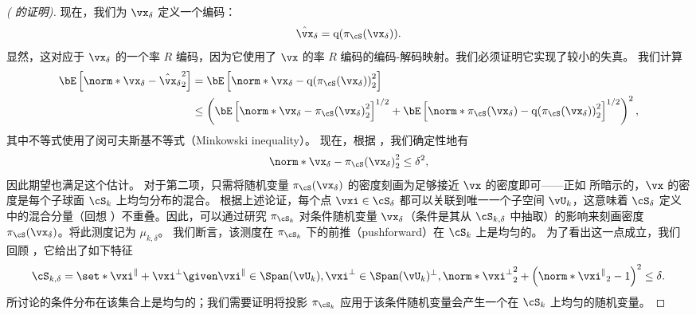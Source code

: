 \documentclass[../../book-main_zh.tex]{subfiles}
\begin{document}
\begin{proof}[( 的证明)]
    现在，我们为 $\vx_{\delta}$ 定义一个编码：
    \begin{equation}
        \hat{\vx}_{\delta} = \mathrm{q}( \pi_{\cS}(\vx_{\delta}) ).
    \end{equation}
    显然，这对应于 $\vx_{\delta}$ 的一个率 $R$ 编码，因为它使用了 $\vx$ 的率 $R$ 编码的编码-解码映射。我们必须证明它实现了较小的失真。
    我们计算
    \begin{align}
        \bE\left[ \norm*{ \vx_{\delta} - \hat{\vx}_{\delta} }_2^2 \right]
        &=
        \bE\left[ \norm*{ \vx_{\delta} -
        \mathrm{q}(\pi_{\cS}(\vx_{\delta})) }_2^2 \right]
        \\
        &\leq
        \left(
            \bE\left[ \norm*{ \vx_{\delta} - \pi_{\cS}(\vx_{\delta}) }_2^2
            \right]^{1/2}
            + \bE\left[ \norm*{ \pi_{\cS}(\vx_{\delta})
            - \mathrm{q}(\pi_{\cS}(\vx_{\delta})) }_2^2 \right]^{1/2}
        \right)^2,\label{eq:distortion-decomposition}
    \end{align}
    其中不等式使用了闵可夫斯基不等式（Minkowski inequality）。
    现在，根据 ，我们确定性地有
    \begin{equation}
        \norm*{ \vx_{\delta} - \pi_{\cS}(\vx_{\delta}) }_2^2
        \leq \delta^2,
    \end{equation}
    因此期望也满足这个估计。
    对于第二项，只需将随机变量 $\pi_{\cS}(\vx_{\delta})$ 的密度刻画为足够接近 $\vx$ 的密度即可——正如  所暗示的，$\vx$ 的密度是每个子球面 $\cS_k$ 上均匀分布的混合。
    根据上述论证，每个点 $\vxi \in \cS_{\delta}$ 都可以关联到唯一一个子空间 $\vU_k$，这意味着 $\cS_{\delta}$ 定义中的混合分量（回想 ）不重叠。因此，可以通过研究 $\pi_{\cS_k}$ 对条件随机变量 $\vx_{\delta}$（条件是其从 $\cS_{k, \delta}$ 中抽取）的影响来刻画密度 $\pi_{\cS}(\vx_{\delta})$。将此测度记为 $\mu_{k, \delta}$。
    我们断言，该测度在 $\pi_{\cS_k}$ 下的前推（pushforward）在 $\cS_k$ 上是均匀的。
    为了看出这一点成立，我们回顾 ，它给出了如下特征
    \begin{equation}
        \cS_{k, \delta} = \set*{
            \vxi^{\|} + \vxi^{\perp}
            \given
            \vxi^{\|} \in \Span(\vU_k),
            \vxi^{\perp} \in \Span(\vU_k)^\perp,
            \norm*{\vxi^{\perp}}_2^2
            + \left( \norm*{\vxi^{\|}}_2 - 1 \right)^2
            \leq
            \delta
        }.
    \end{equation}
    所讨论的条件分布在该集合上是均匀的；我们需要证明将投影 $\pi_{\cS_k}$ 应用于该条件随机变量会产生一个在 $\cS_k$ 上均匀的随机变量。

\end{proof}
\end{document}
